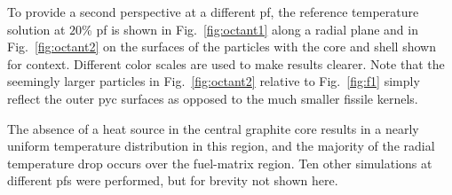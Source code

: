 To provide a second perspective at a different \gls{pf}, the reference temperature solution at \(20\)\% \gls{pf} is shown in Fig.\ \ref{fig:octant1} along a radial plane and in Fig.\ \ref{fig:octant2} on the surfaces of the particles with the core and shell shown for context. Different color scales are used to make results clearer. Note that the seemingly larger particles in Fig.\ \ref{fig:octant2} relative to Fig.\ \ref{fig:f1} simply reflect the outer \gls{pyc} surfaces as opposed to the much smaller fissile kernels.

The absence of a heat source in the central graphite core results in a nearly uniform temperature distribution in this region, and the majority of the radial temperature drop occurs over the fuel-matrix region. Ten other simulations at different \glspl{pf} were performed, but for brevity not shown here.

